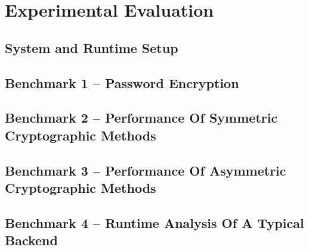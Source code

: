 \chapter{Experimental Evaluation}

\section{System and Runtime Setup}

\section{Benchmark 1 -- Password Encryption}

\section{Benchmark 2 -- Performance Of Symmetric Cryptographic Methods}

\section{Benchmark 3 -- Performance Of Asymmetric Cryptographic Methods}

\section{Benchmark 4 -- Runtime Analysis Of A Typical Backend}

